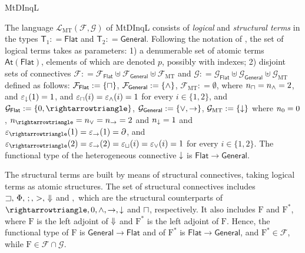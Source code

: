 \begin{entry}{MtDInqL}
\begin{clarifications}
The language $\mathcal{L}_\mathrm{MT}(\mathcal{F}, \mathcal{G})$ of  MtDInqL consists of  {\em logical}   and {\em structural terms} in the types $\mathsf{T}_1:  = \mathsf{Flat}$ and $\mathsf{T}_2: = \mathsf{General}$. Following the notation of , the set  of logical terms takes as parameters: 1) a denumerable  set of atomic terms $\mathsf{At}(\mathsf{Flat})$, elements of which are denoted $p$, possibly with indexes; 2) disjoint sets of connectives $\mathcal{F}: = \mathcal{F}_{\mathsf{Flat}}\uplus\mathcal{F}_{\mathsf{General}}\uplus\mathcal{F}_{\mathrm{MT}}$ and $\mathcal{G}: = \mathcal{G}_{\mathsf{Flat}}\uplus\mathcal{G}_{\mathsf{General}}\uplus\mathcal{G}_{\mathrm{MT}}$ defined as follows: 
$\mathcal{F}_{\mathsf{Flat}}: = \{\sqcap\}$, $\mathcal{F}_{\mathsf{General}}: = \{\wedge \}$, $\mathcal{F}_{\mathrm{MT}}: = \emptyset$, where  $n_\sqcap = n_\wedge = 2$,  and $\varepsilon_{{\downarrow}}(1) = 1$, and $\varepsilon_{\sqcap}(i) = \varepsilon_{\wedge}(i) = 1$ for every $i\in \{1, 2\}$, and
$\mathcal{G}_{\mathsf{Flat}}: = \{\cbot, \cra\}$, $\mathcal{G}_{\mathsf{General}}: = \{\vee,\to \}$, $\mathcal{G}_{\mathrm{MT}}: = \{{\downarrow}\}$ where  $n_0 = 0$, $n_\cra = n_\ior = n_{\ira} =  2$  and $n_{{\downarrow}} = 1$ and $\varepsilon_{\cra}(1) = \varepsilon_{\ira}(1) = \partial$, and $\varepsilon_{\cra}(2) = \varepsilon_{\ira}(2) = \varepsilon_{\cor}(i) = \varepsilon_{\ior}(i) = 1$ for every $i\in \{1, 2\}$. The functional type of the heterogeneous connective ${\downarrow}$ is $\mathsf{Flat}\rightarrow \mathsf{General}$.

The structural terms are built by means of structural connectives, taking logical terms as atomic structures. The set of structural connectives includes  $\sqsupset,\, \Phi,\,  ;, \, >,\, {\Downarrow}$ and $,$ which are the structural counterparts of $\cra, \cbot, \iand, \ira, \bh$ and $\sqcap$, respectively. It also includes $\mathrm{F}$ and $\mathrm{F}^\ast$, where $\mathrm{F}$ is the left adjoint of ${\Downarrow}$ and  $\mathrm{F}^\ast$ is the left  adjoint of $\mathrm{F}$. Hence, the functional type of $\mathrm{F}$ is $\mathsf{General}\rightarrow \mathsf{Flat}$ and of $\mathrm{F}^\ast$ is $\mathsf{Flat}\rightarrow \mathsf{General}$, and  $\mathrm{F}^\ast\in \mathcal{F}$, while $\mathrm{F}\in \mathcal{F}\cap \mathcal{G}$. 


\end{clarifications}
\end{entry}
